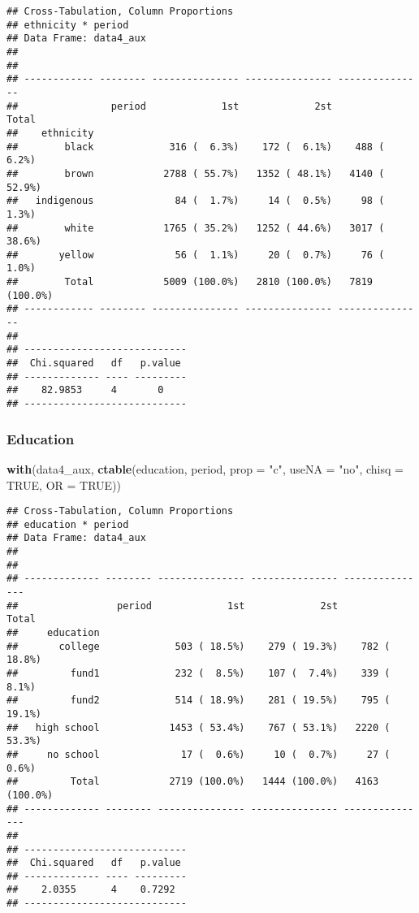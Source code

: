 \documentclass[
]{article}
\newenvironment{Shaded}{\begin{snugshade}}{\end{snugshade}}
\newcommand{\DataTypeTok}[1]{\textcolor[rgb]{0.13,0.29,0.53}{#1}}
\newcommand{\KeywordTok}[1]{\textcolor[rgb]{0.13,0.29,0.53}{\textbf{#1}}}
\newcommand{\NormalTok}[1]{#1}
\newcommand{\OtherTok}[1]{\textcolor[rgb]{0.56,0.35,0.01}{#1}}
\newcommand{\StringTok}[1]{\textcolor[rgb]{0.31,0.60,0.02}{#1}}
\begin{document}
\begin{verbatim}
## Cross-Tabulation, Column Proportions  
## ethnicity * period  
## Data Frame: data4_aux  
## 
## 
## ------------ -------- --------------- --------------- ---------------
##                period             1st             2st           Total
##    ethnicity                                                         
##        black             316 (  6.3%)    172 (  6.1%)    488 (  6.2%)
##        brown            2788 ( 55.7%)   1352 ( 48.1%)   4140 ( 52.9%)
##   indigenous              84 (  1.7%)     14 (  0.5%)     98 (  1.3%)
##        white            1765 ( 35.2%)   1252 ( 44.6%)   3017 ( 38.6%)
##       yellow              56 (  1.1%)     20 (  0.7%)     76 (  1.0%)
##        Total            5009 (100.0%)   2810 (100.0%)   7819 (100.0%)
## ------------ -------- --------------- --------------- ---------------
## 
## ----------------------------
##  Chi.squared   df   p.value 
## ------------- ---- ---------
##    82.9853     4       0    
## ----------------------------
\end{verbatim}

\hypertarget{education-2}{%
\subsubsection{Education}\label{education-2}}

\begin{Shaded}
\begin{Highlighting}[]
\KeywordTok{with}\NormalTok{(data4_aux, }\KeywordTok{ctable}\NormalTok{(education, period, }\DataTypeTok{prop =} \StringTok{"c"}\NormalTok{, }\DataTypeTok{useNA =} \StringTok{"no"}\NormalTok{, }\DataTypeTok{chisq =} \OtherTok{TRUE}\NormalTok{, }\DataTypeTok{OR =} \OtherTok{TRUE}\NormalTok{))}
\end{Highlighting}
\end{Shaded}

\begin{verbatim}
## Cross-Tabulation, Column Proportions  
## education * period  
## Data Frame: data4_aux  
## 
## 
## ------------- -------- --------------- --------------- ---------------
##                 period             1st             2st           Total
##     education                                                         
##       college             503 ( 18.5%)    279 ( 19.3%)    782 ( 18.8%)
##         fund1             232 (  8.5%)    107 (  7.4%)    339 (  8.1%)
##         fund2             514 ( 18.9%)    281 ( 19.5%)    795 ( 19.1%)
##   high school            1453 ( 53.4%)    767 ( 53.1%)   2220 ( 53.3%)
##     no school              17 (  0.6%)     10 (  0.7%)     27 (  0.6%)
##         Total            2719 (100.0%)   1444 (100.0%)   4163 (100.0%)
## ------------- -------- --------------- --------------- ---------------
## 
## ----------------------------
##  Chi.squared   df   p.value 
## ------------- ---- ---------
##    2.0355      4    0.7292  
## ----------------------------
\end{verbatim}
\end{document}
